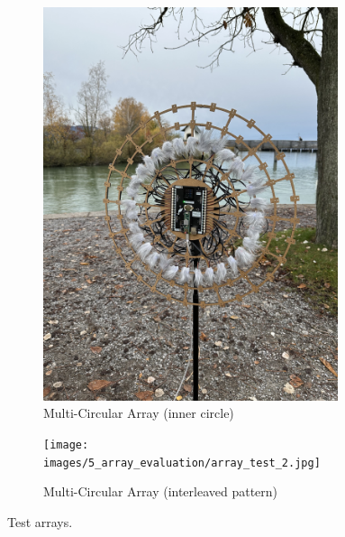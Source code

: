 \begin{figure}[]
	\centering
	\begin{subfigure}[b]{0.49\textwidth}
		\centering
		\includegraphics[width=0.95\textwidth]{images/5_array_evaluation/array_test_1.jpg}
		\caption{Multi-Circular Array (inner circle)}
		\label{fig:array_test_1}
	\end{subfigure}
	\begin{subfigure}[b]{0.49\textwidth}
		\centering
		\texttt{[image: images/5\_array\_evaluation/array\_test\_2.jpg]}
		\caption{Multi-Circular Array (interleaved  pattern)}
		\label{fig:array_test_2}
	\end{subfigure}
	\caption{Test arrays.}
	\label{fig:testSetup}
\end{figure}

